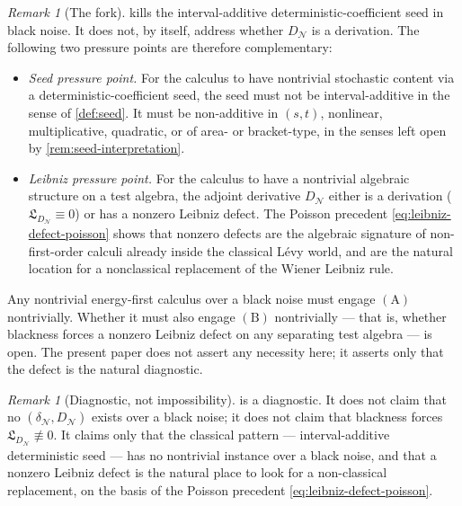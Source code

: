 \documentclass[11pt,reqno]{amsart}
\theoremstyle{plain}
\theoremstyle{definition}
\theoremstyle{remark}
\newtheorem{remark}[theorem]{Remark}
\begin{document}
\begin{remark}[The fork]\label{rem:diagnostic-fork}
 kills the interval-additive
deterministic-coefficient seed in black noise. It does not, by
itself, address whether $D_{\mathcal N}$ is a derivation. The
following two pressure points are therefore complementary:
\begin{itemize}
\item[$(\mathrm A)$] \emph{Seed pressure point.} For the calculus
to have nontrivial stochastic content via a deterministic-coefficient
seed, the seed must not be interval-additive in the sense of
\cref{def:seed}. It must be non-additive in $(s,t)$, nonlinear,
multiplicative, quadratic, or of area- or bracket-type, in the
senses left open by \cref{rem:seed-interpretation}.
\item[$(\mathrm B)$] \emph{Leibniz pressure point.} For the calculus
to have a nontrivial algebraic structure on a test algebra, the
adjoint derivative $D_{\mathcal N}$ either is a derivation
($\mathfrak L_{D_{\mathcal N}}\equiv 0$) or has a nonzero Leibniz
defect. The Poisson precedent \eqref{eq:leibniz-defect-poisson}
shows that nonzero defects are the algebraic signature of
non-first-order calculi already inside the classical L\'evy world,
and are the natural location for a nonclassical replacement of the
Wiener Leibniz rule.
\end{itemize}
Any nontrivial energy-first calculus over a black noise must engage
$(\mathrm A)$ nontrivially. Whether it must also engage $(\mathrm B)$
nontrivially --- that is, whether blackness forces a nonzero Leibniz
defect on any separating test algebra --- is open. The present paper
does not assert any necessity here; it asserts only that the
defect is the natural diagnostic.
\end{remark}

\begin{remark}[Diagnostic, not impossibility]\label{rem:leibniz-diagnostic}
 is a diagnostic. It does not claim that no
$(\delta_{\mathcal N},D_{\mathcal N})$ exists over a black noise; it
does not claim that blackness forces
$\mathfrak L_{D_{\mathcal N}}\not\equiv 0$. It claims only that the
classical pattern --- interval-additive deterministic seed --- has
no nontrivial instance over a black noise, and that a nonzero
Leibniz defect is the natural place to look for a non-classical
replacement, on the basis of the Poisson precedent
\eqref{eq:leibniz-defect-poisson}.
\end{remark}
\end{document}
